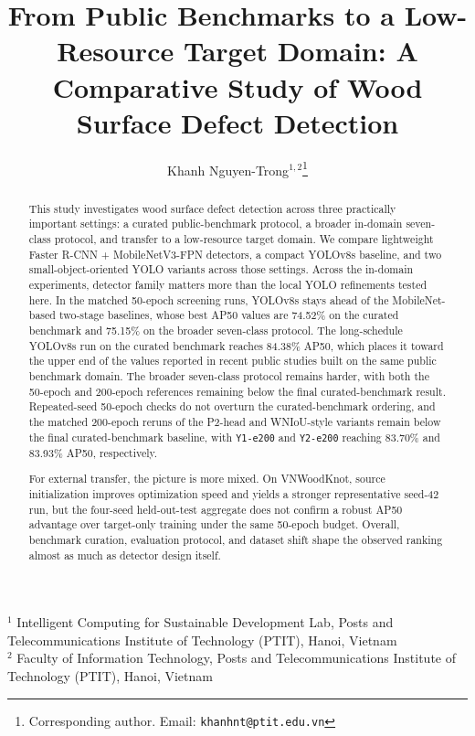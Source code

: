 \documentclass[10pt,a4paper]{article}
\title{From Public Benchmarks to a Low-Resource Target Domain: A Comparative Study of Wood Surface Defect Detection}
\author{
  Khanh Nguyen-Trong$^{1,2}$\thanks{Corresponding author. Email: \texttt{khanhnt@ptit.edu.vn}}
}
\date{}
\begin{document}
\maketitle

\begin{center}
\small
$^{1}$ Intelligent Computing for Sustainable Development Lab, Posts and Telecommunications Institute of Technology (PTIT), Hanoi, Vietnam \\
$^{2}$ Faculty of Information Technology, Posts and Telecommunications Institute of Technology (PTIT), Hanoi, Vietnam
\end{center}

\begin{abstract}
This study investigates wood surface defect detection across three practically important settings: a curated public-benchmark protocol, a broader in-domain seven-class protocol, and transfer to a low-resource target domain. We compare lightweight Faster R-CNN + MobileNetV3-FPN detectors, a compact YOLOv8s baseline, and two small-object-oriented YOLO variants across those settings. Across the in-domain experiments, detector family matters more than the local YOLO refinements tested here. In the matched 50-epoch screening runs, YOLOv8s stays ahead of the MobileNet-based two-stage baselines, whose best AP50 values are 74.52\% on the curated benchmark and 75.15\% on the broader seven-class protocol. The long-schedule YOLOv8s run on the curated benchmark reaches 84.38\% AP50, which places it toward the upper end of the values reported in recent public studies built on the same public benchmark domain. The broader seven-class protocol remains harder, with both the 50-epoch and 200-epoch references remaining below the final curated-benchmark result. Repeated-seed 50-epoch checks do not overturn the curated-benchmark ordering, and the matched 200-epoch reruns of the P2-head and WNIoU-style variants remain below the final curated-benchmark baseline, with \texttt{Y1-e200} and \texttt{Y2-e200} reaching 83.70\% and 83.93\% AP50, respectively.

For external transfer, the picture is more mixed. On VNWoodKnot, source initialization improves optimization speed and yields a stronger representative seed-42 run, but the four-seed held-out-test aggregate does not confirm a robust AP50 advantage over target-only training under the same 50-epoch budget. Overall, benchmark curation, evaluation protocol, and dataset shift shape the observed ranking almost as much as detector design itself.
\end{abstract}
\end{document}
